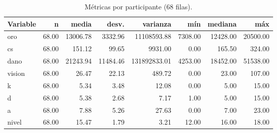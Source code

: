 \begin{table}[H]
\centering
\small
\caption{Métricas por participante (68 filas).}
\label{tab:metricas}
\begin{tabular}{lrrrrrrr}
\toprule
Variable & n & media & desv. & varianza & mín & mediana & máx \\
\midrule
oro & 68.00 & 13006.78 & 3332.96 & 11108593.88 & 7308.00 & 12428.00 & 20500.00 \\
cs & 68.00 & 151.12 & 99.65 & 9931.00 & 0.00 & 165.50 & 324.00 \\
dano & 68.00 & 21243.94 & 11484.46 & 131892833.01 & 4253.00 & 18452.00 & 51538.00 \\
vision & 68.00 & 26.47 & 22.13 & 489.72 & 0.00 & 23.00 & 107.00 \\
k & 68.00 & 5.34 & 3.48 & 12.08 & 0.00 & 5.00 & 15.00 \\
d & 68.00 & 5.38 & 2.68 & 7.17 & 1.00 & 5.00 & 15.00 \\
a & 68.00 & 7.88 & 5.26 & 27.63 & 0.00 & 7.00 & 23.00 \\
nivel & 68.00 & 15.47 & 1.79 & 3.21 & 12.00 & 16.00 & 18.00 \\
\bottomrule
\end{tabular}
\end{table}
